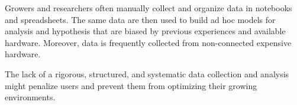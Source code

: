 Growers and researchers often manually
collect and organize data in notebooks and spreadsheets.
The same data are then used to build ad hoc models for analysis and hypothesis that are biased by previous experiences and available hardware. Moreover, data is frequently collected from non-connected expensive hardware.


The lack of a rigorous, structured, and systematic
data collection and analysis might penalize users and
prevent them from optimizing their growing environments.


